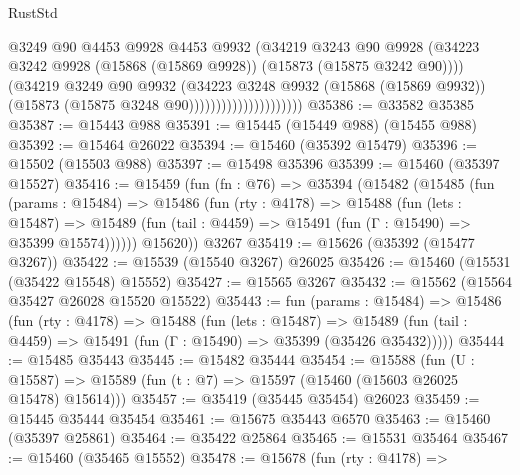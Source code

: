 \begin{lexlean}{RustStd}
\begin{coremodule}
                                      @3249
                                      @90
                                      @4453
                                      @9928
                                      @4453
                                      @9932
                                      (@34219
                                        @3243
                                        @90
                                        @9928
                                        (@34223
                                          @3242
                                          @9928
                                          (@15868 (@15869 @9928))
                                          (@15873 (@15875 @3242 @90))))
                                      (@34219
                                        @3249
                                        @90
                                        @9932
                                        (@34223
                                          @3248
                                          @9932
                                          (@15868 (@15869 @9932))
                                          (@15873 (@15875 @3248 @90)))))))))))))))))))))
@35386 := @33582 @35385
@35387 := @15443 @988
@35391 := @15445 (@15449 @988) (@15455 @988)
@35392 := @15464 @26022
@35394 := @15460 (@35392 @15479)
@35396 := @15502 (@15503 @988)
@35397 := @15498 @35396
@35399 := @15460 (@35397 @15527)
@35416 := @15459
    (fun (fn : @76) =>
    @35394
      (@15482
        (@15485
          (fun (params : @15484) =>
          @15486
            (fun (rty : @4178) =>
            @15488
              (fun (lets : @15487) =>
              @15489 (fun (tail : @4459) => @15491 (fun (Γ : @15490) => @35399 @15574))))))
        @15620))
    @3267
@35419 := @15626 (@35392 (@15477 @3267))
@35422 := @15539 (@15540 @3267) @26025
@35426 := @15460 (@15531 (@35422 @15548) @15552)
@35427 := @15565 @3267
@35432 := @15562 (@15564 @35427 @26028 @15520 @15522)
@35443 := fun (params : @15484) =>
  @15486
    (fun (rty : @4178) =>
    @15488
      (fun (lets : @15487) =>
      @15489 (fun (tail : @4459) => @15491 (fun (Γ : @15490) => @35399 (@35426 @35432)))))
@35444 := @15485 @35443
@35445 := @15482 @35444
@35454 := @15588
    (fun (U : @15587) => @15589 (fun (t : @7) => @15597 (@15460 (@15603 @26025 @15478) @15614)))
@35457 := @35419 (@35445 @35454) @26023
@35459 := @15445 @35444 @35454
@35461 := @15675 @35443 @6570
@35463 := @15460 (@35397 @25861)
@35464 := @35422 @25864
@35465 := @15531 @35464
@35467 := @15460 (@35465 @15552)
@35478 := @15678
    (fun (rty : @4178) =>

\end{coremodule}
\end{lexlean}

